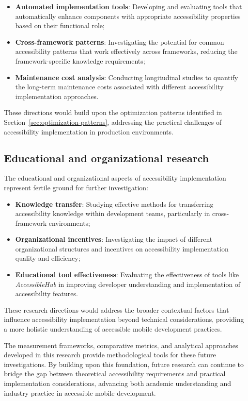 \begin{itemize}
    \item \textbf{Automated implementation tools}: Developing and evaluating tools that automatically enhance components with appropriate accessibility properties based on their functional role;

    \item \textbf{Cross-framework patterns}: Investigating the potential for common accessibility patterns that work effectively across frameworks, reducing the framework-specific knowledge requirements;

    \item \textbf{Maintenance cost analysis}: Conducting longitudinal studies to quantify the long-term maintenance costs associated with different accessibility implementation approaches.
\end{itemize}

These directions would build upon the optimization patterns identified in Section~\ref{sec:optimization-patterns}, addressing the practical challenges of accessibility implementation in production environments.

\subsection{Educational and organizational research}
\label{subsec:future-educational}

The educational and organizational aspects of accessibility implementation represent fertile ground for further investigation:

\begin{itemize}
    \item \textbf{Knowledge transfer}: Studying effective methods for transferring accessibility knowledge within development teams, particularly in cross-framework environments;

    \item \textbf{Organizational incentives}: Investigating the impact of different organizational structures and incentives on accessibility implementation quality and efficiency;

    \item \textbf{Educational tool effectiveness}: Evaluating the effectiveness of tools like \textit{AccessibleHub} in improving developer understanding and implementation of accessibility features.
\end{itemize}

These research directions would address the broader contextual factors that influence accessibility implementation beyond technical considerations, providing a more holistic understanding of accessible mobile development practices.

The measurement frameworks, comparative metrics, and analytical approaches developed in this research provide methodological tools for these future investigations. By building upon this foundation, future research can continue to bridge the gap between theoretical accessibility requirements and practical implementation considerations, advancing both academic understanding and industry practice in accessible mobile development.